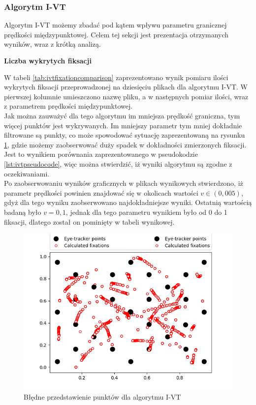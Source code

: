 \subsubsection{Algorytm I-VT}
\label{sssec:ivtresults}
Algorytm I-VT możemy zbadać pod kątem wpływu parametru granicznej prędkości międzypunktowej. Celem tej sekcji jest prezentacja otrzymanych wyników, wraz z krótką analizą.\par
\textbf{Liczba wykrytych fiksacji}\par
W tabeli \ref{tab:ivtfixationcomparison} zaprezentowano wynik pomiaru ilości wykrytych fiksacji przeprowadzonej na dziesięciu plikach dla algorytmu I-VT. W pierwszej kolumnie umieszczono nazwę pliku, a w następnych pomiar ilości, wraz z parametrem prędkości międzypunktowej.\\
Jak można zauważyć dla tego algorytmu im mniejsza prędkość graniczna, tym więcej punktów jest wykrywanych. Im mniejszy parametr tym mniej dokładnie filtrowane są punkty, co może spowodować sytuację zaprezentowaną na rysunku \ref{fig:ivterrorresults}, gdzie możemy zaobserwować duży spadek w dokładności zmierzonych fiksacji.
Jest to wynikiem porównania zaprezentowanego w pseudokodzie \ref{lst:ivtpseudocode}, więc można stwierdzić, iż wyniki algorytmu są zgodne z oczekiwaniami.\\
Po zaobserwowaniu wyników graficznych w plikach wynikowych stwierdzono, iż parametr prędkości powinien znajdować się w okolicach wartości $v \in (0,005)$, gdyż dla tego wyniku zaobserwowano najdokładniejsze wyniki. Ostatnią wartością badaną było $v = 0,1$, jednak dla tego parametru wynikiem było od 0 do 1 fiksacji, dlatego został on pominięty w tabeli wynikowej.\par
\begin{figure}[H]
    \centering
    \captionsetup{justification=centering,margin=2cm}
    \includegraphics[width=\linewidth]{resources/ivt-errorresults.png}
    \caption{Błędne przedstawienie punktów dla algorytmu I-VT}
    \label{fig:ivterrorresults}
\end{figure}
